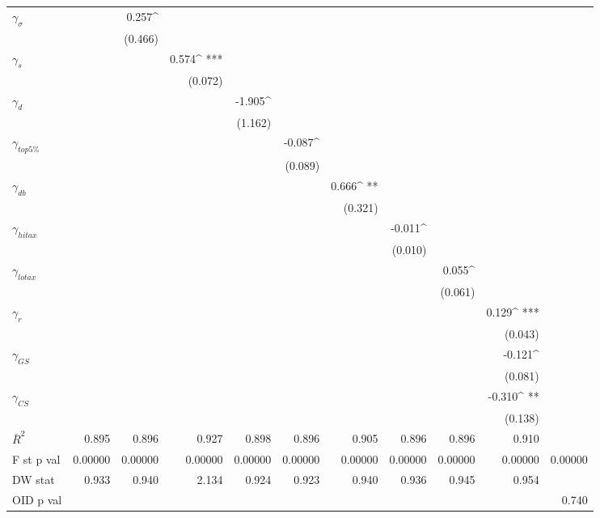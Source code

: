 \begin{sidewaystable}
\begin{center}
\begin{tabular}{@{}ld{6}d{6}d{6}d{6}d{6}d{6}d{6}d{6}d{6}d{6}@{}}
 $\gamma_{\sigma}$   &   & 0.257^{ }  &  &  &  & & & & & \\
 &   &  (0.466)  &  &   &  & & & & & \\
 $\gamma_s$   &   & & 0.574^{ ***}  &  &  & & & & & \\
 &   &  & (0.072)  &  &  & & & & & \\
 $\gamma_d$   &   & & &-1.905^{ }  &  &  & & & & \\
 &   &  &  &(1.162)  &  &  & & & & \\
 $\gamma_{top5\%}$   &   & & & & -0.087^{ }  &  &  & & & \\
 &   &  &  & & (0.089)  &  &  & & &  \\
 $\gamma_{db}$   &   & & & & & 0.666^{ **}    &  & & &  \\
 &   &  & & & & (0.321)    &  & & &   \\
 $\gamma_{hitax}$   &   & & & & & & -0.011^{ }  &  &  &  \\
 &  & &  & & & & (0.010)  &  &  &  \\
 $\gamma_{lotax}$   &   & & & & & & &0.055^{ }   &  &  \\
 &  & & & & & & & (0.061)   &  & \\
 $\gamma_{r}$  &   & & & & & & & & 0.129^{ ***}  &  \\
 &   &  & & & & & & & (0.043)  &  \\
 $\gamma_{GS}$  &  & & & & & & & &  -0.121^{ }  & \\
 &   & & & & & & & &  (0.081)  &   \\
 $\gamma_{CS}$  &   & & & & & & & &  -0.310^{ **}  &  \\
 &  & & & & & & & &  (0.138)  &  \\
\midrule 
 $\bar{R}^2$  & 0.895  & 0.896  & 0.927  & 0.898  & 0.896  & 0.905  & 0.896  & 0.896  & 0.910  & \\
 F st p val  & 0.00000  & 0.00000  & 0.00000  & 0.00000  & 0.00000  & 0.00000  & 0.00000  & 0.00000  & 0.00000  & 0.00000\\
DW stat  & 0.933  & 0.940  & 2.134  & 0.924  & 0.923  & 0.940  & 0.936  & 0.945  & 0.954 & \\
OID p val &  & & & &  & & & & &0.740\\
\bottomrule
\end{tabular}
\end{center}

\end{sidewaystable}
